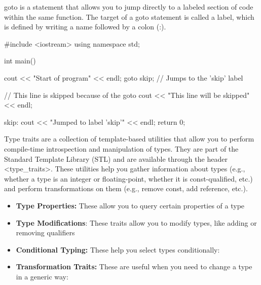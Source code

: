 \documentclass{report}
\begin{document}
   \pagebreak 
   \bigbreak \noindent 
   goto is a statement that allows you to jump directly to a labeled section of code within the same function. The target of a goto statement is called a label, which is defined by writing a name followed by a colon (:).
   \bigbreak \noindent 
   \begin{cppcode}
       #include <iostream>
       using namespace std;

       int main() {
           cout << "Start of program" << endl;
           goto skip;  // Jumps to the 'skip' label

           // This line is skipped because of the goto
           cout << "This line will be skipped" << endl;

           skip:
           cout << "Jumped to label 'skip'" << endl;
           return 0;
       }
   \end{cppcode}


   \pagebreak 
   \bigbreak \noindent 
   Type traits are a collection of template-based utilities that allow you to perform compile-time introspection and manipulation of types. They are part of the Standard Template Library (STL) and are available through the header <type\_traits>. These utilities help you gather information about types (e.g., whether a type is an integer or floating-point, whether it is const-qualified, etc.) and perform transformations on them (e.g., remove const, add reference, etc.).
   \begin{itemize}
       \item \textbf{Type Properties:} These allow you to query certain properties of a type
       \item \textbf{Type Modifications}: These traits allow you to modify types, like adding or removing qualifiers
        \item \textbf{Conditional Typing:} These help you select types conditionally:
        \item \textbf{Transformation Traits:} These are useful when you need to change a type in a generic way:
   \end{itemize}

   \bigbreak \noindent 
\end{document}

